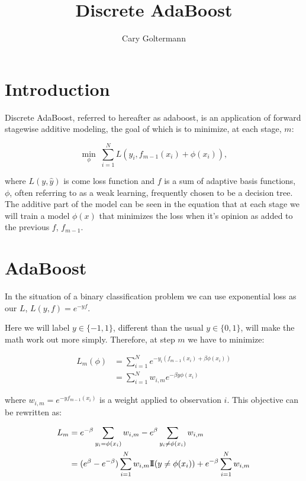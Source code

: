 \documentclass[a4paper, 12pt]{article}
\title{Discrete AdaBoost}
\author{Cary Goltermann}
\begin{document}
\maketitle

\section*{Introduction}
Discrete AdaBoost, referred to hereafter as adaboost, is an application of forward stagewise additive modeling, the goal of which is to minimize, at each stage, $m$:

$$ \min\limits_{\phi} \; \sum_{i=1}^N L(y_i, f_{m-1}(x_i) + \phi(x_i)), $$

where $L(y, \hat{y})$ is come loss function and $f$ is a sum of adaptive basis functions, $\phi$, often referring to as a weak learning, frequently chosen to be a decision tree.
\vspace{1em}
The additive part of the model can be seen in the equation that at each stage we will train a model $\phi(x)$ that minimizes the loss when it's opinion as added to the previous $f$, $f_{m-1}$.

\section*{AdaBoost}
In the situation of a binary classification problem we can use exponential loss as our $L$, $L(y, f) = e^{-yf}$.

\vspace{1em}
Here we will label $y \in \{-1, 1\}$, different than the usual $y \in \{0, 1\}$, will make the math work out more simply. Therefore, at step $m$ we have to minimize:

\begin{align*}
  L_m(\phi) &= \sum_{i=1}^N e^{-y_i(f_{m-1}(x_i) + \beta \phi(x_i))} \\
            &= \sum_{i=1}^N w_{i,m} e^{-\beta y \phi(x_i)}
\end{align*}

where $w_{i,m} = e^{-y f_{m-1}(x_i)}$ is a weight applied to observation $i$. This objective can be rewritten as:

\begin{align*}
  L_m &= e^{-\beta} \sum_{y_i=\phi(x_i)} w_{i,m} - e^\beta \sum_{y_i \ne \phi(x_i)} w_{i,m} \\
      &= (e^\beta - e^{-\beta}) \sum_{i=1}^N w_{i,m} {\rm I\!I}(y \ne \phi(x_i)) + e^{-\beta} \sum_{i=1}^N w_{i,m}
\end{align*}
\end{document}
